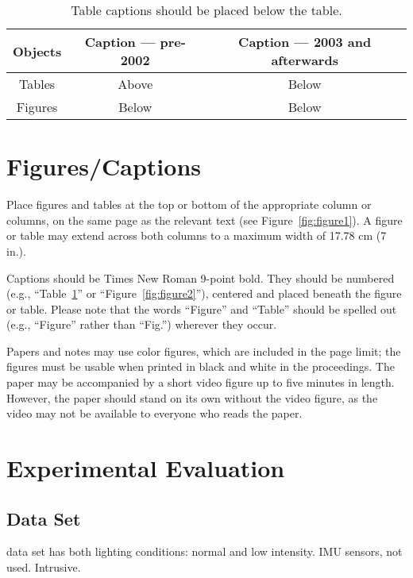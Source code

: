 \documentclass{sigchi}
\newcommand\tabhead[1]{\small\textbf{#1}}
\begin{document}
\begin{table}
  \centering
  \begin{tabular}{|c|c|c|}
    \hline
    \tabhead{Objects} &
    \multicolumn{1}{|p{0.3\columnwidth}|}{\centering\tabhead{Caption --- pre-2002}} &
    \multicolumn{1}{|p{0.4\columnwidth}|}{\centering\tabhead{Caption --- 2003 and afterwards}} \\
    \hline
    Tables & Above & Below \\
    \hline
    Figures & Below & Below \\
    \hline
  \end{tabular}
  \caption{Table captions should be placed below the table.}
  \label{tab:table1}
\end{table}

\section{Figures/Captions}

Place figures and tables at the top or bottom of the appropriate
column or columns, on the same page as the relevant text
(see Figure~\ref{fig:figure1}). A figure or table may extend across both
columns to a maximum width of 17.78 cm (7 in.).

Captions should be Times New Roman 9-point bold.  They should be numbered (e.g.,
``Table~\ref{tab:table1}'' or ``Figure~\ref{fig:figure2}''), centered
and placed beneath the figure or table.  Please note that the words
``Figure'' and ``Table'' should be spelled out (e.g., ``Figure''
rather than ``Fig.'') wherever they occur.

Papers and notes may use color figures, which are included in the page
limit; the figures must be usable when printed in black and white in
the proceedings.  The paper may be accompanied by a short video figure
up to five minutes in length.  However, the paper should stand on its
own without the video figure, as the video may not be available to
everyone who reads the paper.


\section{Experimental Evaluation}

\subsection{Data Set}
data set has both lighting conditions: normal and low intensity. IMU sensors, not used. Intrusive.
\end{document}
